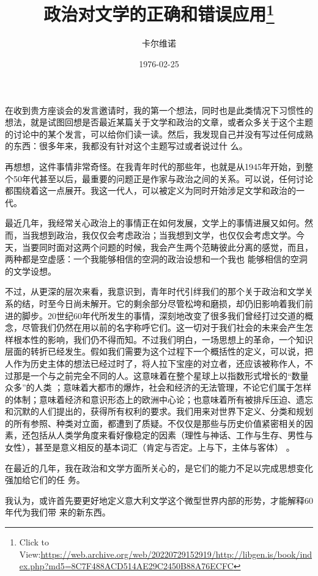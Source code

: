 \documentclass{article}
\title{政治对文学的正确和错误应用\footnote{Click to View:\url{https://web.archive.org/web/20220729152919/http://libgen.is/book/index.php?md5=8C7F488ACD514AE29C2450B88A76ECFC}}}
\author{卡尔维诺}
\date{1976-02-25}
\begin{document}

\maketitle


\Large

﻿在收到贵方座谈会的发言邀请时，我的第一个想法，同时也是此类情况下习惯性的想法，就是试图回想是否最近某篇关于文学和政治的文章，或者众多关于这个主题的讨论中的某个发言，可以给你们读一读。然后，我发现自己并没有写过任何成熟的东西：很多年来，我都没有针对这个主题写过或者说过什
么。 

再想想，这件事情非常奇怪。在我青年时代的那些年，也就是从1945年开始，到整个50年代甚至以后，最重要的问题正是作家与政治之间的关系。可以说，任何讨论都围绕着这一点展开。我这一代人，可以被定义为同时开始涉足文学和政治的一代。
 

\newpage

最近几年，我经常关心政治上的事情正在如何发展，文学上的事情进展又如何。然而，当我想到政治，我仅仅会考虑政治；当我想到文学，也仅仅会考虑文学。今天，当要同时面对这两个问题的时候，我会产生两个范畴彼此分离的感觉，而且，两种都是空虚感：一个我能够相信的空洞的政治设想和一个我也
能够相信的空洞的文学设想。 

不过，从更深的层次来看，我意识到，青年时代引绊我们的那个关于政治和文学关系的结，时至今日尚未解开。它的剩余部分尽管松垮和磨损，却仍旧影响着我们前进的脚步。20世纪60年代所发生的事情，深刻地改变了很多我们曾经打过交道的概念，尽管我们仍然在用以前的名字称呼它们。这一切对于我们社会的未来会产生怎样根本性的影响，我们仍不得而知。不过我们明白，一场思想上的革命，一个知识层面的转折已经发生。假如我们需要为这个过程下一个概括性的定义，可以说，把人作为历史主体的想法已经过时了，将人拉下宝座的对立者，还应该被称作人，不过那是一个与之前完全不同的人。这意味着在整个星球上以指数形式增长的“数量众多”的人类
\newpage
；意味着大都市的爆炸，社会和经济的无法管理，不论它们属于怎样的体制；意味着经济和意识形态上的欧洲中心论；也意味着所有被排斥压迫、遗忘和沉默的人们提出的，获得所有权利的要求。我们用来对世界下定义、分类和规划的所有参照、种类对立面，都遭到了质疑。不仅仅是那些与历史价值紧密相关的因素，还包括从人类学角度来看好像稳定的因素（理性与神话、工作与生存、男性与女性），甚至是意义相反的基本词汇（肯定与否定。上与下，主体与客体）
。 

在最近的几年，我在政治和文学方面所关心的，是它们的能力不足以完成思想变化强加给它们的任
务。 

我认为，或许首先要更好地定义意大利文学这个微型世界内部的形势，才能解释60年代为我们带
来的新东西。 
\end{document}
